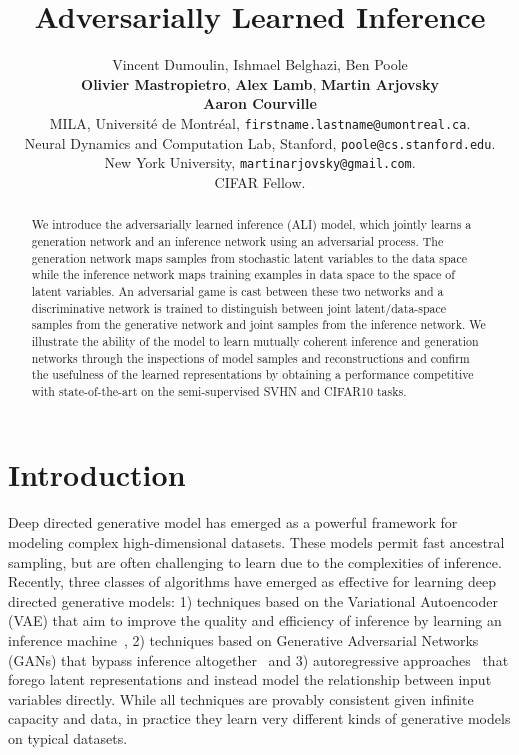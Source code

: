 \documentclass{article}
\title{Adversarially Learned Inference}
\author{
  Vincent Dumoulin, Ishmael Belghazi, Ben Poole\\
  {\bf Olivier Mastropietro}, {\bf Alex Lamb}, {\bf Martin Arjovsky}\\
  {\bf Aaron Courville}\\
   MILA, Universit\'e de Montr\'eal, \texttt{firstname.lastname@umontreal.ca}.\\
   Neural Dynamics and Computation Lab, Stanford, \texttt{poole@cs.stanford.edu}. \\
   New York University, \texttt{martinarjovsky@gmail.com}. \\
  CIFAR Fellow.\\
}
\begin{document}
\maketitle

\begin{abstract}
We introduce the adversarially learned inference (ALI) model, which jointly
learns a generation network and an inference network using an adversarial
process. The generation network maps samples from stochastic latent variables to
the data space while the inference network maps training examples in data space
to the space of latent variables. An adversarial game is cast between these two
networks and a discriminative network is trained to distinguish between
joint latent/data-space samples from the generative network and joint samples
from the inference network.  We illustrate the ability of the model to learn
mutually coherent inference and generation networks through the inspections of
model samples and reconstructions and confirm the usefulness of the learned
representations by obtaining a performance competitive with state-of-the-art
on the semi-supervised SVHN and CIFAR10 tasks.
\end{abstract}

\section{Introduction}

Deep directed generative model has emerged as a powerful framework for modeling
complex high-dimensional datasets. These models permit fast ancestral sampling,
but are often challenging to learn due to the complexities of inference.
Recently, three classes of algorithms have emerged as effective for learning
deep directed generative models: 1) techniques based on the Variational
Autoencoder (VAE) that aim to improve the quality and efficiency of inference by
learning an inference machine~\citep{kingma2013auto,rezende2014stochastic}, 2)
techniques based on Generative Adversarial Networks (GANs) that bypass inference
altogether~\citep{goodfellow2014generative} and 3) autoregressive
approaches~\citep{van2016pixel,van2016pixelcnn,van2016wavenet} that forego
latent representations and instead model the relationship between input
variables directly. While all techniques are provably consistent given infinite
capacity and data, in practice they learn very different kinds of generative
models on typical datasets.
\end{document}
